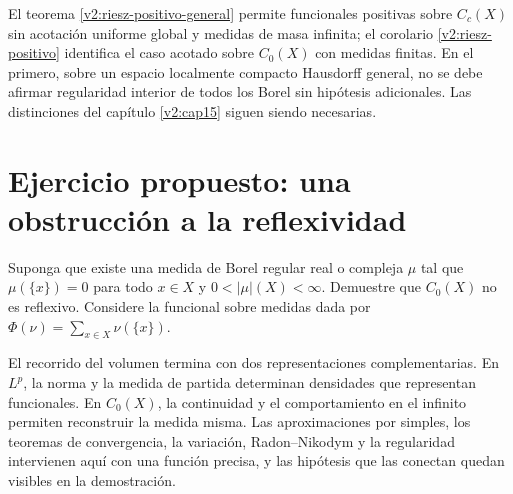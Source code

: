 \begin{observacion}
El teorema \ref{v2:riesz-positivo-general} permite funcionales positivas sobre $C_c(X)$ sin acotación uniforme global y medidas de masa infinita; el corolario \ref{v2:riesz-positivo} identifica el caso acotado sobre $C_0(X)$ con medidas finitas. En el primero, sobre un espacio localmente compacto Hausdorff general, no se debe afirmar regularidad interior de todos los Borel sin hipótesis adicionales. Las distinciones del capítulo \ref{v2:cap15} siguen siendo necesarias.
\end{observacion}

\section{Ejercicio propuesto: una obstrucción a la reflexividad}
\begin{ejercicio}\label{ej:v2-l33-1}
Suponga que existe una medida de Borel regular real o compleja $\mu$ tal que $\mu(\{x\})=0$ para todo $x\in X$ y $0<|\mu|(X)<\infty$. Demuestre que $C_0(X)$ no es reflexivo. Considere la funcional sobre medidas dada por $\Phi(\nu)=\sum_{x\in X}\nu(\{x\})$.
\end{ejercicio}


El recorrido del volumen termina con dos representaciones complementarias. En $L^p$, la norma y la medida de partida determinan densidades que representan funcionales. En $C_0(X)$, la continuidad y el comportamiento en el infinito permiten reconstruir la medida misma. Las aproximaciones por simples, los teoremas de convergencia, la variación, Radon--Nikodym y la regularidad intervienen aquí con una función precisa, y las hipótesis que las conectan quedan visibles en la demostración.
